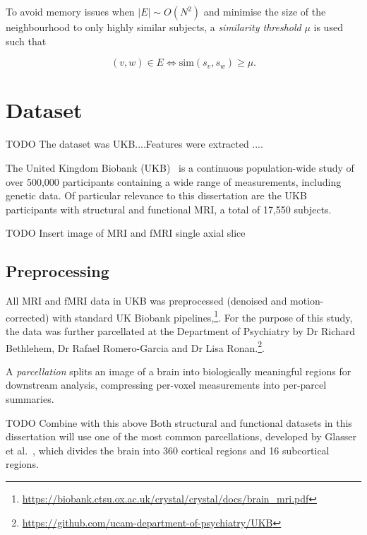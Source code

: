To avoid memory issues when $|E| \sim O(N^2)$ and minimise the size of the neighbourhood to only highly similar subjects, a \textit{similarity threshold} $\mu$ is used such that

\begin{equation}
    (v, w) \in E \iff \mathrm{sim}(s_v, s_w) \geq \mu.
\end{equation}


\section{Dataset}
\label{dataset}

TODO The dataset  was UKB....Features were extracted ....

The United Kingdom Biobank (UKB)~\cite{sudlow2015uk} is a continuous population-wide study of over 500,000 participants containing a wide range of measurements, including genetic data. Of particular relevance to this dissertation are the UKB participants with structural and functional MRI, a total of 17,550 subjects.

TODO Insert image of MRI and fMRI single axial slice

\subsection{Preprocessing}

All MRI and fMRI data in UKB was preprocessed (denoised and motion-corrected) with standard UK Biobank pipelines,\footnote{\url{https://biobank.ctsu.ox.ac.uk/crystal/crystal/docs/brain_mri.pdf}}. For the purpose of this study, the data was further parcellated at the Department of Psychiatry by Dr Richard Bethlehem, Dr Rafael Romero-Garcia and Dr Lisa Ronan.\footnote{\url{https://github.com/ucam-department-of-psychiatry/UKB}}.

A \textit{parcellation} splits an image of a brain into biologically meaningful regions for downstream analysis, compressing per-voxel measurements into per-parcel summaries.

TODO Combine with this above
Both structural and functional datasets in this dissertation will use one of the most common parcellations, developed by Glasser et al.~\cite{glasser2016multi}, which divides the brain into 360 cortical regions and 16 subcortical regions. 


